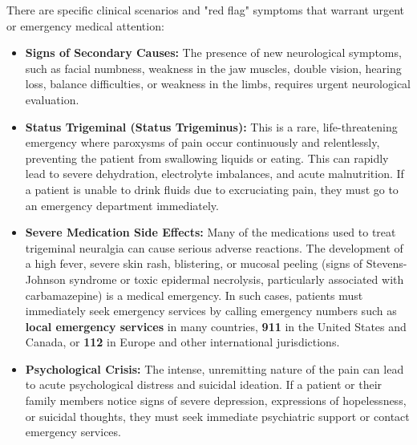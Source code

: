 There are specific clinical scenarios and "red flag" symptoms that warrant urgent or emergency medical attention:
\begin{itemize}
  \item \textbf{Signs of Secondary Causes:} The presence of new neurological symptoms, such as facial numbness, weakness in the jaw muscles, double vision, hearing loss, balance difficulties, or weakness in the limbs, requires urgent neurological evaluation.
  \item \textbf{Status Trigeminal (Status Trigeminus):} This is a rare, life-threatening emergency where paroxysms of pain occur continuously and relentlessly, preventing the patient from swallowing liquids or eating. This can rapidly lead to severe dehydration, electrolyte imbalances, and acute malnutrition. If a patient is unable to drink fluids due to excruciating pain, they must go to an emergency department immediately.
  \item \textbf{Severe Medication Side Effects:} Many of the medications used to treat trigeminal neuralgia can cause serious adverse reactions. The development of a high fever, severe skin rash, blistering, or mucosal peeling (signs of Stevens-Johnson syndrome or toxic epidermal necrolysis, particularly associated with carbamazepine) is a medical emergency. In such cases, patients must immediately seek emergency services by calling emergency numbers such as \textbf{local emergency services} in many countries, \textbf{911} in the United States and Canada, or \textbf{112} in Europe and other international jurisdictions.
  \item \textbf{Psychological Crisis:} The intense, unremitting nature of the pain can lead to acute psychological distress and suicidal ideation. If a patient or their family members notice signs of severe depression, expressions of hopelessness, or suicidal thoughts, they must seek immediate psychiatric support or contact emergency services.
\end{itemize}

